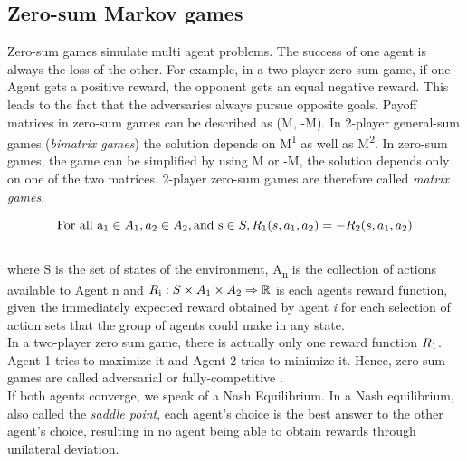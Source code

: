 \subsection{Zero-sum Markov games}
\label{zerosumgames}

Zero-sum games simulate multi agent problems. The success of one agent is always the loss of the other. For example, in a two-player zero sum game, if one Agent gets a positive reward, the opponent gets an equal negative reward. This leads to the fact that the adversaries always pursue opposite goals. Payoff matrices in zero-sum games can be described as (M, -M). 
In 2-player general-sum games (\textit{bimatrix games}) the solution depends on M\textsuperscript{1} as well as M\textsuperscript{2}. In zero-sum games, the game can be simplified by using M or -M, the solution depends only on one of the two matrices. 2-player zero-sum games are therefore called \textit{matrix games}\cite{basics2hu1998multiagent}.

\[ 
\text{For all a\textsubscript{1}} \in A\textsubscript{1}, a \textsubscript{2} \in A\textsubscript{2}, \text{and s} \in S, R\textsubscript{1}(s, a\textsubscript{1}, a \textsubscript{2}) = - R\textsubscript{2}(s, a\textsubscript{1}, a \textsubscript{2})
\]
\\
where S is the set of states of the environment, A\textsubscript{n} is the collection of actions available to Agent n and $R\textsubscript{i}:S\times A\textsubscript{1}\times A\textsubscript{2} \Rightarrow \mathbb{R}$ is each agents reward function,  given the immediately expected reward obtained by agent \textit{i} for each selection of action sets that the group of agents could make in any state\cite{basics1littman1994markov}.\\
In a two-player zero sum game, there is actually only one reward function $R\textsubscript{1}$. Agent 1 tries to maximize it and Agent 2 tries to minimize it. Hence, zero-sum games are called adversarial or fully-competitive \cite{basics1littman1994markov}.\\
If both agents converge, we speak of a Nash Equilibrium.
In a Nash equilibrium, also called the \textit{saddle point}, each agent's choice is the best answer to the other agent's choice, resulting in no agent being able to obtain rewards through unilateral deviation\cite{nashgharesifard2013distributed, basics2hu1998multiagent}.



